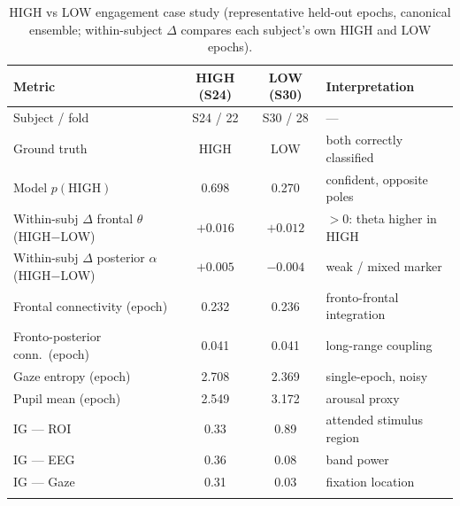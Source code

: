 \begin{table}[t]
  \centering
  \caption{HIGH vs LOW engagement case study (representative held-out epochs, canonical ensemble; within-subject $\Delta$ compares each subject's own HIGH and LOW epochs).}
  \label{tab:case_study}
  \small
  \begin{tabular}{@{}lccl@{}}
    \toprule
    Metric & HIGH (S24) & LOW (S30) & Interpretation \\
    \midrule
    Subject / fold & S24 / 22 & S30 / 28 & --- \\
    Ground truth & HIGH & LOW & both correctly classified \\
    Model $p(\mathrm{HIGH})$ & 0.698 & 0.270 & confident, opposite poles \\
    Within-subj $\Delta$ frontal $\theta$ (HIGH$-$LOW) & $+0.016$ & $+0.012$ & $>0$: theta higher in HIGH \\
    Within-subj $\Delta$ posterior $\alpha$ (HIGH$-$LOW) & $+0.005$ & $-0.004$ & weak / mixed marker \\
    Frontal connectivity (epoch) & 0.232 & 0.236 & fronto-frontal integration \\
    Fronto-posterior conn.\ (epoch) & 0.041 & 0.041 & long-range coupling \\
    Gaze entropy (epoch) & 2.708 & 2.369 & single-epoch, noisy \\
    Pupil mean (epoch) & 2.549 & 3.172 & arousal proxy \\
    IG --- ROI & 0.33 & 0.89 & attended stimulus region \\
    IG --- EEG & 0.36 & 0.08 & band power \\
    IG --- Gaze & 0.31 & 0.03 & fixation location \\
    \botrule
  \end{tabular}
\end{table}
